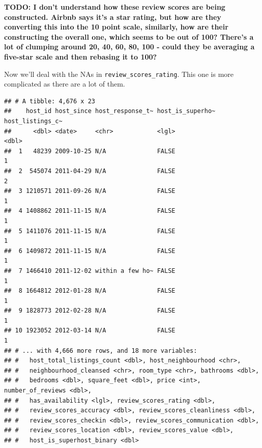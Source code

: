 \documentclass[
]{book}
\newenvironment{Shaded}{\begin{snugshade}}{\end{snugshade}}
\newcommand{\KeywordTok}[1]{\textcolor[rgb]{0.13,0.29,0.53}{\textbf{#1}}}
\newcommand{\NormalTok}[1]{#1}
\newcommand{\OperatorTok}[1]{\textcolor[rgb]{0.81,0.36,0.00}{\textbf{#1}}}
\newcommand{\StringTok}[1]{\textcolor[rgb]{0.31,0.60,0.02}{#1}}
\begin{document}
\textbf{TODO: I don't understand how these review scores are being constructed. Airbnb says it's a star rating, but how are they converting this into the 10 point scale, similarly, how are their constructing the overall one, which seems to be out of 100? There's a lot of clumping around 20, 40, 60, 80, 100 - could they be averaging a five-star scale and then rebasing it to 100?}

Now we'll deal with the NAs in \texttt{review\_scores\_rating}. This one is more complicated as there are a lot of them.

\begin{Shaded}
\end{Shaded}

\begin{verbatim}
## # A tibble: 4,676 x 23
##    host_id host_since host_response_t~ host_is_superho~ host_listings_c~
##      <dbl> <date>     <chr>            <lgl>                       <dbl>
##  1   48239 2009-10-25 N/A              FALSE                           1
##  2  545074 2011-04-29 N/A              FALSE                           2
##  3 1210571 2011-09-26 N/A              FALSE                           1
##  4 1408862 2011-11-15 N/A              FALSE                           1
##  5 1411076 2011-11-15 N/A              FALSE                           1
##  6 1409872 2011-11-15 N/A              FALSE                           1
##  7 1466410 2011-12-02 within a few ho~ FALSE                           1
##  8 1664812 2012-01-28 N/A              FALSE                           1
##  9 1828773 2012-02-28 N/A              FALSE                           1
## 10 1923052 2012-03-14 N/A              FALSE                           1
## # ... with 4,666 more rows, and 18 more variables:
## #   host_total_listings_count <dbl>, host_neighbourhood <chr>,
## #   neighbourhood_cleansed <chr>, room_type <chr>, bathrooms <dbl>,
## #   bedrooms <dbl>, square_feet <dbl>, price <int>, number_of_reviews <dbl>,
## #   has_availability <lgl>, review_scores_rating <dbl>,
## #   review_scores_accuracy <dbl>, review_scores_cleanliness <dbl>,
## #   review_scores_checkin <dbl>, review_scores_communication <dbl>,
## #   review_scores_location <dbl>, review_scores_value <dbl>,
## #   host_is_superhost_binary <dbl>
\end{verbatim}
\end{document}
